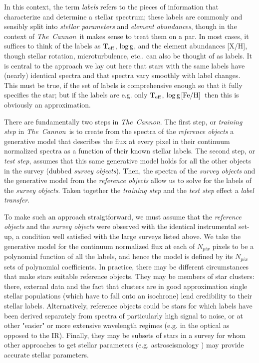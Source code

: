 \documentclass[12pt, preprint]{aastex}
\newcommand{\teff}{\mbox{$\rm T_{eff}$}}
\newcommand{\feh}{\mbox{$\rm [Fe/H]$}}
\newcommand{\logg}{\mbox{$\rm \log g$}}
\newcommand{\tc}{\textsl{The~Cannon}}
\begin{document}
In this context, the term {\sl labels} refers to the pieces of information that characterize and determine a stellar spectrum; these labels are commonly and sensibly split into {\sl stellar parameters} and {\sl element abundances}, though in the context of \tc\ it makes sense to treat them on a par. 
In most cases, it suffices to think of the labels as \teff , \logg, and the element abundances [X/H], though stellar rotation, microturbulence, etc.. can also be thought of as labels. It is central to the approach we lay out here that stars with the same labels have (nearly) identical spectra and that spectra vary smoothly with label changes. 
This must be true, if the set of labels is comprehensive enough so that it fully specifies the star; but if the labels are e.g. only \teff, \logg \feh\ then this is obviously an approximation. 

There are fundamentally two steps in \tc . 
The first step, or \textit{training step} in \tc\ is to create from the spectra of the \textit{reference objects} a generative model that describes
 the flux at every pixel in their continuum normalized spectra as a function of their known stellar labels.
The second step, or \textit{test step}, assumes that this same generative model holds for all the other objects in the survey (dubbed \textit{survey objects}). 
Then, the spectra of the \textit{survey objects} and the generative model from the \textit{reference objects}
allow us to solve for the labels of the \textit{survey objects}. 
Taken together the \textit{training step} and the \textit{test step} effect a \textit{label transfer}. 

To make such an approach straigtforward, we must assume that the \textit{reference objects} and the \textit{survey objects} were observed with the identical instrumental set-up, a condition well satisfied with the large surveys listed above. 
We take the generative model for the continuum normalized flux at each of $N_{pix}$ pixels to be a polynomial function of all the labels, and hence the model is defined by its $N_{pix}$ sets of polynomial coefficients. In practice, there may be different circumstances that make stars suitable reference objects. 
They may be members of star clusters: there, external data and the fact that clusters are in good approximation single stellar populations (which have to fall onto an isochrone) lend credibility to their stellar labels. 
Alternatively, reference objects could be stars for which labels have been derived separately from spectra of particularly high signal to noise, or at other "easier" or more extensive wavelength regimes (e.g. in the optical as opposed to the IR). 
Finally, they may be subsets of stars in a survey  for whom other approaches to get stellar parameters (e.g. astroseismology ) may provide accurate stellar parameters.
\end{document}
